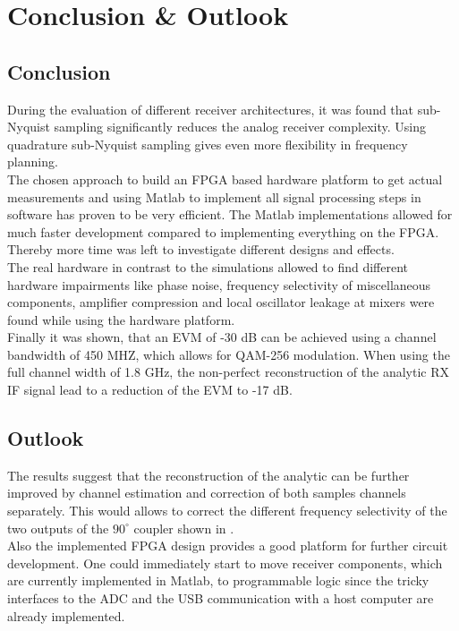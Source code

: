 \chapter{Conclusion \& Outlook}
\section{Conclusion}
During the evaluation of different receiver architectures, it was found
that sub-Nyquist sampling significantly reduces the analog receiver complexity.
Using quadrature sub-Nyquist sampling gives even more flexibility in frequency
planning. \\

The chosen approach to build an \gls{FPGA} based hardware platform to get
actual measurements and using Matlab to implement all signal processing steps
in software has proven to be very efficient. The Matlab implementations
allowed for much faster development compared to implementing everything on the
\gls{FPGA}. Thereby more time was left to investigate different designs and
effects. \\

The real hardware in contrast to the simulations allowed to find
different hardware impairments like phase noise, frequency selectivity of
miscellaneous components, amplifier compression and local oscillator leakage at
mixers were found while using the hardware platform. \\

Finally it was shown, that an \gls{EVM} of -30 dB can be achieved using a channel
bandwidth of 450 MHZ, which allows for \gls{QAM}-256 modulation.
When using the full channel width of 1.8 GHz, the non-perfect
reconstruction of the analytic \gls{RX} \gls{IF} signal lead to a reduction of the
\gls{EVM} to -17 dB.

\section{Outlook}
The results suggest that the reconstruction of the analytic can be further
improved by channel estimation and correction of both samples channels
separately. This would allows to correct the different frequency selectivity
of the two outputs of the $90^\circ$ coupler shown in . \\

Also the implemented \gls{FPGA} design provides a good platform
for further circuit development. One could immediately start to
move receiver components, which are currently implemented in Matlab,
to programmable logic since the tricky interfaces to the \gls{ADC}
and the \gls{USB} communication with a host computer are already implemented.

